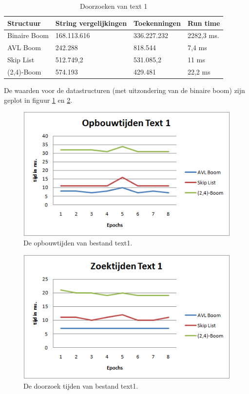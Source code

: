 \begin{table}
\begin{tabularx}{\linewidth}{| l | X| X| X | }
 \hline
 Structuur & String vergelijkingen &  Toekenningen & Run time \\
 \hline
 	Binaire Boom & 168.113.616 & 336.227.232 & 2282,3 ms. \\
 	\hline
 	AVL Boom & 242.288 & 818.544 & 7,4 ms \\
 	\hline
 	Skip List & 512.749,2 & 531.085,2 & 11 ms \\
 	\hline
 	(2,4)-Boom & 574.193 & 429.481 & 22,2 ms \\
 	\hline
\end{tabularx}
\label{tbl_text1_search}
\caption{Doorzoeken van text 1}
\end{table}

De waarden voor de datastructuren (met uitzondering van de binaire boom) zijn geplot in figuur \ref{fig:opbouwtext1} en \ref{fig:zoektext1}.

\begin{figure}[h]
	\centering
		\includegraphics[width=\textwidth]{chap7/opbouwtijdtext1}
		\caption{De opbouwtijden van bestand text1.}
	\label{fig:opbouwtext1}
\end{figure}

\begin{figure}[h]
	\centering
		\includegraphics[width=\textwidth]{chap7/zoektijdtext1}
		\caption{De doorzoek tijden van bestand text1.}
	\label{fig:zoektext1}
\end{figure}

